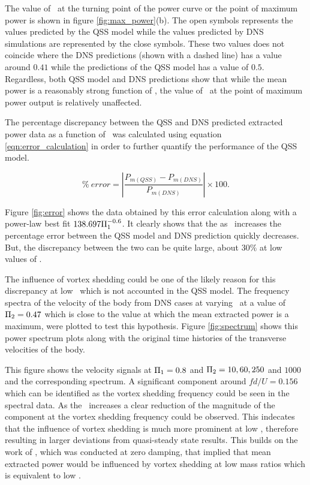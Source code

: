 The value of \massdamp\ at the turning point  of the power curve or the point of maximum power is shown in figure \ref{fig:max_power}(b). The open symbols represents the values predicted by the QSS model while the values predicted by DNS simulations are represented by the close symbols. These two values does not coincide where the DNS predictions (shown with a dashed line) has a value around $0.41$ while the predictions of the QSS model has a value of $0.5$. Regardless, both QSS model and DNS predictions show that while the mean power is a reasonably strong function of \massstiff, the value of \massdamp\ at the point of maximum power output is relatively unaffected.


The percentage discrepancy between the QSS and DNS predicted extracted power data as a function of \massstiff\ was calculated using equation \ref{eqn:error_calculation} in order to further quantify the performance of the QSS model.  
 
\begin{equation}   \label{eqn:error_calculation} 
\% \ error=\left|{\frac{P_{m(QSS)} - P_{m(DNS)}}{P_{m(DNS)}}}\right| \times 100.
\end{equation}

Figure \ref{fig:error} shows the data obtained by this error calculation along with a power-law best fit $138.697\Pi_1^{-0.6}$. It clearly shows that the as \massstiff\ increases the percentage error between the QSS model and DNS prediction quickly decreases. But, the discrepancy between the two can be quite large, about $30\%$ at low values of \massstiff.



The influence of vortex shedding could be one of the likely reason for this discrepancy at low \massstiff\ which is not accounted in the QSS model. The frequency spectra of the velocity of the body from DNS cases at varying \massstiff\  at a value of $\Pi_2=0.47$ which is close to the value at which the mean extracted power is a maximum, were plotted to test this hypothesis. Figure \ref{fig:spectrum} shows this power spectrum plots along with the original time histories of the transverse velocities of the body. 





This figure shows the  velocity signals at $\Pi_1=0.8$ and $\Pi_2= 10, 60, 250$ and $1000$ and the corresponding spectrum. A significant component around $fd/U=0.156$ which can be identified as the vortex shedding frequency could be seen in the spectral data. As the \massstiff\ increases a clear reduction of the magnitude of the component at the  vortex shedding frequency could be observed. This indecates that the influence of vortex shedding is much more prominent at low \massstiff,  therefore resulting in larger deviations from quasi-steady state results. This builds on the work of \cite{Joly2012}, which was conducted at zero damping, that implied that mean extracted power would be influenced by vortex shedding at low mass ratios which is equivalent to low \massstiff.

